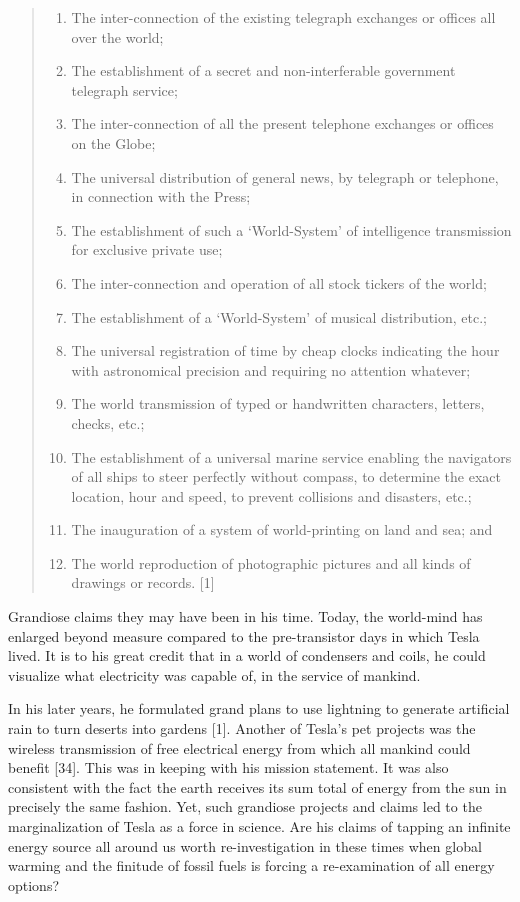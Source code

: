 \documentclass[
  11pt,
  a4paper,
]{article}
\providecommand{\tightlist}{%
  \setlength{\itemsep}{0pt}\setlength{\parskip}{0pt}}
\begin{document}
\begin{quote}
\begin{enumerate}
\tightlist
\item
  The inter-connection of the existing telegraph exchanges or offices
  all over the world;
\item
  The establishment of a secret and non-interferable government
  telegraph service;
\item
  The inter-connection of all the present telephone exchanges or offices
  on the Globe;
\item
  The universal distribution of general news, by telegraph or telephone,
  in connection with the Press;
\item
  The establishment of such a `World-System' of intelligence
  transmission for exclusive private use;
\item
  The inter-connection and operation of all stock tickers of the world;
\item
  The establishment of a `World-System' of musical distribution, etc.;
\item
  The universal registration of time by cheap clocks indicating the hour
  with astronomical precision and requiring no attention whatever;
\item
  The world transmission of typed or handwritten characters, letters,
  checks, etc.;
\item
  The establishment of a universal marine service enabling the
  navigators of all ships to steer perfectly without compass, to
  determine the exact location, hour and speed, to prevent collisions
  and disasters, etc.;
\item
  The inauguration of a system of world-printing on land and sea; and
\item
  The world reproduction of photographic pictures and all kinds of
  drawings or records. {[}1{]}
\end{enumerate}
\end{quote}

Grandiose claims they may have been in his time. Today, the world-mind
has enlarged beyond measure compared to the pre-transistor days in which
Tesla lived. It is to his great credit that in a world of condensers and
coils, he could visualize what electricity was capable of, in the
service of mankind.

In his later years, he formulated grand plans to use lightning to
generate artificial rain to turn deserts into gardens {[}1{]}. Another
of Tesla's pet projects was the wireless transmission of free electrical
energy from which all mankind could benefit {[}34{]}. This was in
keeping with his mission statement. It was also consistent with the fact
the earth receives its sum total of energy from the sun in precisely the
same fashion. Yet, such grandiose projects and claims led to the
marginalization of Tesla as a force in science. Are his claims of
tapping an infinite energy source all around us worth re-investigation
in these times when global warming and the finitude of fossil fuels is
forcing a re-examination of all energy options?
\end{document}
